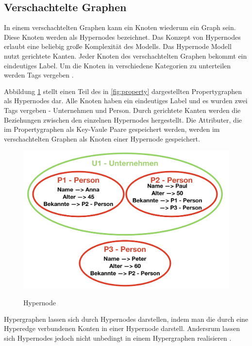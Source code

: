 \subsection{Verschachtelte Graphen}
In einem verschachtelten Graphen kann ein Knoten wiederum ein Graph sein. Diese Knoten werden als Hypernodes bezeichnet.
Das Konzept von Hypernodes erlaubt eine beliebig große Komplexität des Modells.
Das Hypernode Modell nutzt gerichtete Kanten.
Jeder Knoten des verschachtelten Graphen bekommt ein eindeutiges Label.
Um die Knoten in verschiedene Kategorien zu unterteilen werden Tags vergeben \cite{poulovassilis1994nested}.

Abbildung \ref{fig:hypernode} stellt einen Teil des in \ref{fig:property} dargestellten Propertygraphen als Hypernodes dar.
Alle Knoten haben ein eindeutiges Label und es wurden zwei Tags vergeben - Unternehmen und Person.
Durch gerichtete Kanten werden die Beziehungen zwischen den einzelnen Hypernodes hergestellt.
Die Attributer, die im Propertygraphen als Key-Vaule Paare gespeichert werden, werden im verschachtelten Graphen als Knoten einer Hypernode gespeichert.
\begin{figure}[H]
	\begin{center}
		\includegraphics[scale = 0.5]{./images/Hypernode.png}
		\label{fig:hypernode}
		\caption{Hypernode}
	\end{center}
\end{figure}

Hypergraphen lassen sich durch Hypernodes darstellen, indem man die durch eine Hyperedge verbundenen Konten in einer Hypernode darstell.
Andersrum lassen sich Hypernodes jedoch nicht unbedingt in einem Hypergraphen realisieren \cite{poulovassilis1994nested}.